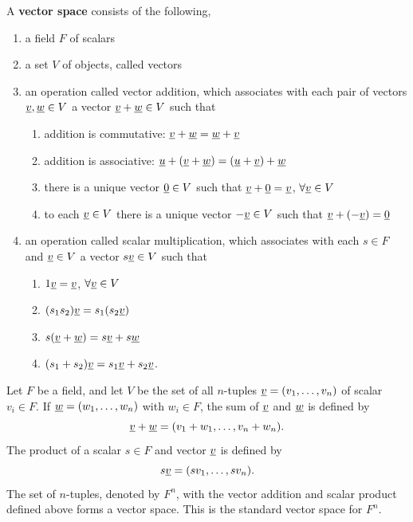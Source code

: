 \begin{definition} \label{definition:VectorSpace}
A \textbf{vector space} consists of the following,
\begin{enumerate}
\item a field $F$ of scalars
\item a set $V$ of objects, called vectors
\item an operation called vector addition, which associates with each pair of vectors $\underline{v}, \underline{w} \in V$ a vector $\underline{v} + \underline{w} \in V$ such that
\begin{enumerate}
\item addition is commutative: $\underline{v} + \underline{w} = \underline{w} + \underline{v}$
\item addition is associative: $\underline{u} + (\underline{v} + \underline{w}) = (\underline{u} + \underline{v}) + \underline{w}$
\item there is a unique vector $\underline{0} \in V$ such that $\underline{v} + \underline{0} = \underline{v}$, $\forall \underline{v} \in V$
\item to each $\underline{v} \in V$ there is a unique vector $- \underline{v} \in V$ such that $\underline{v} + (- \underline{v}) = \underline{0}$
\end{enumerate}
\item an operation called scalar multiplication, which associates with each $s \in F$ and $\underline{v} \in V$ a vector $s \underline{v} \in V$ such that
\begin{enumerate}
\item $1 \underline{v} = \underline{v}$, $\forall \underline{v} \in V$
\item $(s_1 s_2) \underline{v} = s_1 ( s_2 \underline{v} )$
\item $s ( \underline{v} + \underline{w} ) = s \underline{v} + s \underline{w}$
\item $(s_1 + s_2) \underline{v} = s_1 \underline{v} + s_2 \underline{v}$.
\end{enumerate}
\end{enumerate}
\end{definition}

\begin{example}
Let $F$ be a field, and let $V$ be the set of all $n$-tuples $\underline{v} = (v_1, \ldots, v_n)$ of scalar $v_i \in F$.
If $\underline{w} = (w_1, \ldots, w_n)$ with $w_i \in F$, the sum of $\underline{v}$ and $\underline{w}$ is defined by
\begin{equation*}
\underline{v} + \underline{w} = (v_1 + w_1, \ldots, v_n + w_n).
\end{equation*}
The product of a scalar $s \in F$ and vector $\underline{v}$ is defined by
\begin{equation*}
s \underline{v} = (s v_1, \ldots, s v_n).
\end{equation*}
The set of $n$-tuples, denoted by $F^n$, with the vector addition and scalar product defined above forms a vector space.
This is the standard vector space for $F^n$.
\end{example}

